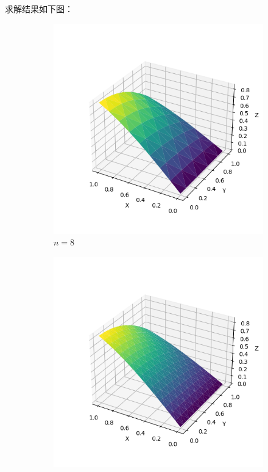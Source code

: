 \documentclass[lang=cn,a4paper,newtx,bibend=bibtex]{elegantpaper}
\begin{document}
求解结果如下图：

\begin{figure}[H]
  \centering
  \begin{subfigure}[b]{0.18\textwidth}
      \includegraphics[width=\textwidth]{../../res_bac/res-[data|2-Neumann-regular-a8].png}
      \caption{$n =  8$}
  \end{subfigure}
  \hfill
  \begin{subfigure}[b]{0.18\textwidth}
      \includegraphics[width=\textwidth]{../../res_bac/res-[data|2-Neumann-regular-b16].png}

\end{subfigure}
\end{figure}
\end{document}
